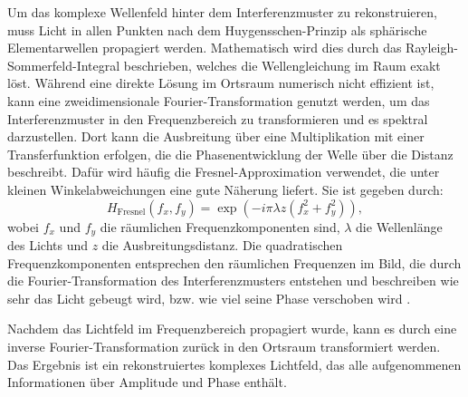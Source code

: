 \documentclass[10pt,twocolumn,a4paper]{article}
\begin{document}
Um das komplexe Wellenfeld hinter dem Interferenzmuster zu rekonstruieren, muss Licht in allen Punkten nach dem Huygensschen-Prinzip als sphärische Elementarwellen propagiert werden. Mathematisch wird dies durch das Rayleigh-Sommerfeld-Integral beschrieben, welches die Wellengleichung im Raum exakt löst. Während eine direkte Lösung im Ortsraum numerisch nicht effizient ist, kann eine zweidimensionale Fourier-Transformation genutzt werden, um das Interferenzmuster in den Frequenzbereich zu transformieren und es spektral darzustellen. Dort kann die Ausbreitung über eine Multiplikation mit einer Transferfunktion erfolgen, die die Phasenentwicklung der Welle über die Distanz beschreibt. Dafür wird häufig die Fresnel-Approximation verwendet, die unter kleinen Winkelabweichungen eine gute Näherung liefert. Sie ist gegeben durch:
\begin{equation}
    H_{\text{Fresnel}}(f_x, f_y) = \exp\left(-i \pi \lambda z \left( f_x^2 + f_y^2 \right)\right),
\end{equation}
wobei $f_x$ und $f_y$ die räumlichen Frequenzkomponenten sind, $\lambda$ die Wellenlänge des Lichts und $z$ die Ausbreitungsdistanz. Die quadratischen Frequenzkomponenten entsprechen den räumlichen Frequenzen im Bild, die durch die Fourier-Transformation des Interferenzmusters entstehen und beschreiben wie sehr das Licht gebeugt wird, bzw. wie viel seine Phase verschoben wird \cite{DH}. 

Nachdem das Lichtfeld im Frequenzbereich propagiert wurde, kann es durch eine inverse Fourier-Transformation zurück in den Ortsraum transformiert werden. Das Ergebnis ist ein rekonstruiertes komplexes Lichtfeld, das alle aufgenommenen Informationen über Amplitude und Phase enthält.
\end{document}
